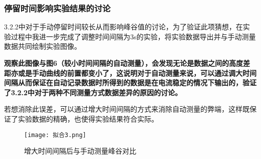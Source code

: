 \documentclass[dvipsnames, svgnames,a4paper,11pt]{article}
\begin{document}
	\subsubsection{停留时间影响实验结果的讨论}
	3.2.2中对于手动停留时间较长从而影响峰谷值的讨论，为了验证此项猜想，在实验过程中我进一步完成了调整时间间隔为3s的实验，将实验数据导出并与手动测量数据共同绘制实验图像。

	\textbf{观察此图像与图6（较小时间间隔的自动测量），会发现无论是数据之间的高度差距亦或是手动曲线的前置都变小了，这说明对于自动测量来说，可以通过调大时间间隔从而保证在自动记录数据时所得到的数据是在电流稳定的情况下输出的，验证了3.2.2中对于两种不同测量方式数据差异的原因的讨论。}

	若想消除此误差，可以通过增大时间间隔的方式来消除自动测量的弊端，这样既保证了实验数据的精确，也使得实验结果符合实际。
	\begin{figure}[{H}]
		\centering
		\texttt{[image: 拟合3.png]}
		\caption{增大时间间隔后与手动测量峰谷对比}
		\label{}
	\end{figure}
\end{document}
